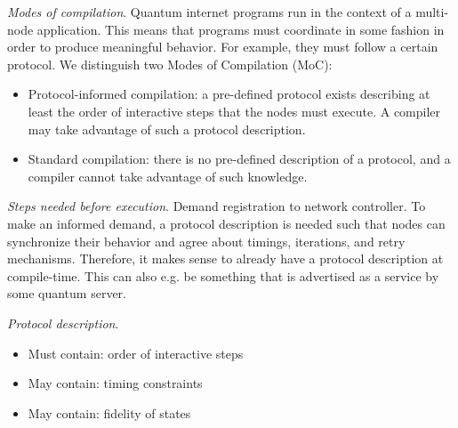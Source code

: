 \textit{Modes of compilation}. Quantum internet programs run in the context of a multi-node application.
This means that programs must coordinate in some fashion in order to produce meaningful behavior.
For example, they must follow a certain protocol.
We distinguish two Modes of Compilation (MoC):
\begin{itemize}
    \item Protocol-informed compilation: a pre-defined protocol exists describing at least the order of interactive steps that the nodes must execute. A compiler may take advantage of such a protocol description.
    \item Standard compilation: there is no pre-defined description of a protocol, and a compiler cannot take advantage of such knowledge.
\end{itemize}

\textit{Steps needed before execution}.
Demand registration to network controller. To make an informed demand, a protocol description is needed such that nodes can synchronize their behavior and agree about timings, iterations, and retry mechanisms. Therefore, it makes sense to already have a protocol description at compile-time. This can also e.g. be something that is advertised as a service by some quantum server.

\textit{Protocol description}.
\begin{itemize}
    \item Must contain: order of interactive steps
    \item May contain: timing constraints
    \item May contain: fidelity of states
\end{itemize}

